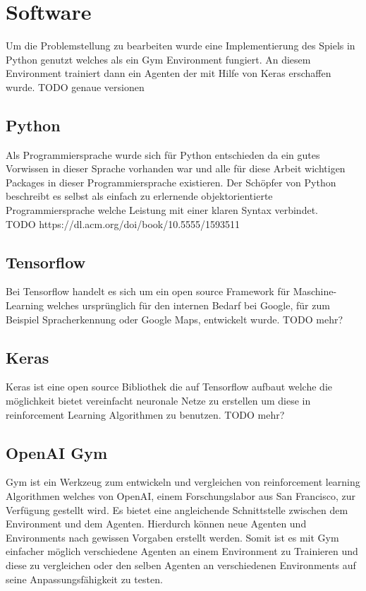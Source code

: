 \section{Software}
Um die Problemstellung zu bearbeiten wurde eine Implementierung des Spiels in Python genutzt welches als ein Gym Environment fungiert. An diesem Environment trainiert dann ein Agenten der mit Hilfe von  Keras erschaffen wurde.
\colorbox{red!30}{TODO genaue versionen}

\subsection{Python}
Als Programmiersprache wurde sich für Python entschieden da ein gutes Vorwissen in dieser Sprache vorhanden war und alle für diese Arbeit wichtigen Packages in dieser Programmiersprache existieren.
Der Schöpfer von Python beschreibt es selbst als einfach zu erlernende objektorientierte Programmiersprache welche Leistung mit einer klaren Syntax verbindet.\\
\colorbox{red!30}{TODO https://dl.acm.org/doi/book/10.5555/1593511}

\subsection{Tensorflow}
Bei Tensorflow handelt es sich um ein open source Framework für Maschine-Learning welches ursprünglich für den internen Bedarf bei Google, für zum Beispiel Spracherkennung oder Google Maps, entwickelt wurde. 
\colorbox{red!30}{TODO mehr?}

\subsection{Keras}
Keras ist eine open source Bibliothek die auf Tensorflow aufbaut welche die möglichkeit bietet vereinfacht neuronale Netze zu erstellen um diese in reinforcement Learning Algorithmen zu benutzen.
\colorbox{red!30}{TODO mehr?}

\subsection{OpenAI Gym}
Gym ist ein Werkzeug zum entwickeln und vergleichen von reinforcement learning Algorithmen welches von OpenAI, einem Forschungslabor aus San Francisco, zur Verfügung gestellt wird. Es bietet eine  \colorbox{red!30}{angleichende  Schnittstelle} zwischen dem Environment und dem Agenten. Hierdurch können neue Agenten und Environments nach gewissen Vorgaben erstellt werden. Somit ist es mit Gym einfacher möglich verschiedene Agenten an einem Environment zu Trainieren und diese zu vergleichen oder den selben Agenten an verschiedenen Environments auf seine Anpassungsfähigkeit zu testen.

